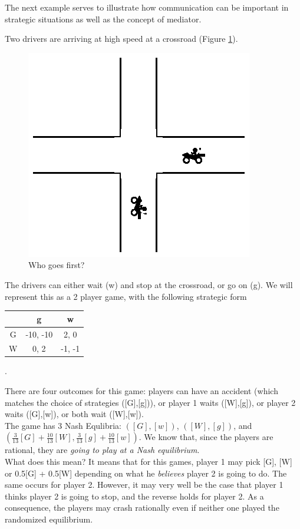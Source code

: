 The next example serves to illustrate how communication can be important in strategic situations as well as the concept of mediator.

\begin{example}
Two drivers are arriving at high speed at a crossroad (Figure \ref{ch6:fig:crossroads}).
\begin{figure}[!ht]
\centering
\includegraphics[scale=1.5]{crossroads.eps}
\caption{Who goes first?}
\label{ch6:fig:crossroads}
\end{figure}
The drivers can either wait (w) and stop at the crossroad, or go on (g).
We will represent this as a 2 player game, with the following strategic form
\begin{center}
\begin{tabular}{c | c  c}
& g & w\\
\hline
G & -10, -10 & 2, 0  \\
W & 0, 2 & -1, -1
\end{tabular}
.
\end{center}

There are four outcomes for this game: players can have an accident (which matches the choice of strategies ([G],[g])), or player 1 waits ([W],[g]), or player 2 waits ([G],[w]), or both wait ([W],[w]). \\
The game has 3 Nash Equlibria: $([G],[w])$, $([W],[g])$, and $(\frac{3}{13}[G] + \frac{10}{13}[W], \frac{3}{13}[g] + \frac{10}{13}[w])$. We know that, since the players are rational, they are \emph{going to play at a Nash equilibrium}. \\
What does this mean? It means that for this games, player 1 may pick [G], [W] or 0.5[G] + 0.5[W] depending on what he \emph{believes} player 2 is going to do. The same occurs for player 2.
However, it may very well be the case that player 1 thinks player 2 is going to stop, and the reverse holds for player 2. As a consequence, the players may crash rationally even if neither one played the randomized equilibrium.


\end{example}
